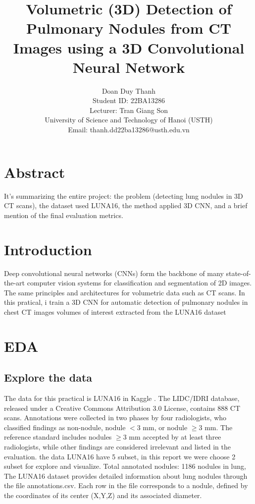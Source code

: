 \documentclass[a4paper, 10pt, twocolumn]{article}
\title{\textbf{Volumetric (3D) Detection of Pulmonary Nodules from CT Images using a 3D Convolutional Neural Network}}
\author{
    Doan Duy Thanh \\
    Student ID: 22BA13286 \\
    Lecturer: Tran Giang Son \\
    University of Science and Technology of Hanoi (USTH) \\
    Email: thanh.dd22ba13286@usth.edu.vn
}
\date{}
\begin{document}
\maketitle 
\section{Abstract}
It's summarizing the entire project: the problem (detecting lung nodules in 3D CT scans), the dataset used LUNA16, the method applied 3D CNN, and a brief mention of the final evaluation metrics.





\section{Introduction}
Deep convolutional neural networks (CNNs) form the backbone of many state-of-the-art computer vision systems for classification and segmentation of 2D images. The same principles and architectures for volumetric data such as CT scans. In this pratical, i train a 3D CNN for automatic detection of pulmonary nodules in chest CT images volumes of interest extracted from the LUNA16 dataset\cite{shen2017cnn}



\section{EDA}
\subsection{Explore the data}
The data for this practical is LUNA16 in Kaggle \cite{luna16}. 
The LIDC/IDRI database, released under a Creative Commons Attribution 3.0 License, contains 888 CT scans. 
Annotations were collected in two phases by four radiologists, who classified findings as non-nodule, nodule $< 3$ mm, or nodule $\geq 3$ mm. 
The reference standard includes nodules $\geq 3$ mm accepted by at least three radiologists, while other findings are considered irrelevant and listed in the evaluation.
the data LUNA16 have  5 subset, in this report we were choose 2 subset for explore and visualize. Total annotated nodules: 1186 nodules in lung, The LUNA16 dataset provides detailed information about lung nodules through the file annotations.csv. Each row in the file corresponds to a nodule, defined by the coordinates of its center  (X,Y,Z) and its associated diameter.
\end{document}
